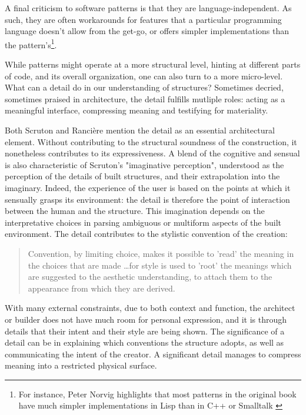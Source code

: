 A final criticism to software patterns is that they are language-independent. As such, they are often workarounds for features that a particular programming language doesn't allow from the get-go, or offers simpler implementations than the pattern's\footnote{For instance, Peter Norvig highlights that most patterns in the original book have much simpler implementations in Lisp than in C++ or Smalltalk \citep{norvig_design_1998}}.

While patterns might operate at a more structural level, hinting at different parts of code, and its overall organization, one can also turn to a more micro-level. What can a detail do in our understanding of structures? Sometimes decried, sometimes praised in architecture, the detail fulfills mutliple roles: acting as a meaningful interface, compressing meaning and testifying for materiality.

Both Scruton and Rancière mention the detail as an essential architectural element. Without contributing to the structural soundness of the construction, it nonetheless contributes to its expressiveness. A blend of the cognitive and sensual is also characteristic of Scruton's "imaginative perception", understood as the perception of the details of built structures, and their extrapolation into the imaginary. Indeed, the experience of the user is based on the points at which it sensually grasps its environment: the detail is therefore the point of interaction between the human and the structure. This imagination depends on the interpretative choices in parsing ambiguous or multiform aspects of the built environment. The detail contributes to the stylistic convention of the creation:

\begin{quote}
    Convention, by limiting choice, makes it possible to 'read' the meaning in the choices that are made \dots for style is used to 'root' the meanings which are suggested to the aesthetic understanding, to attach them to the appearance from which they are derived. \citep{scruton_aesthetics_2013}
\end{quote}

With many external constraints, due to both context and function, the architect or builder does not have much room for personal expression, and it is through details that their intent and their style are being shown. The significance of a detail can be in explaining which conventions the structure adopts, as well as communicating the intent of the creator. A significant detail manages to compress meaning into a restricted physical surface.

